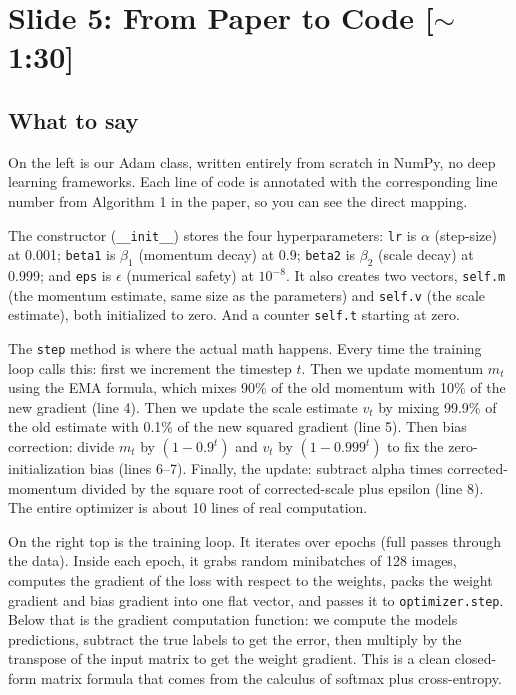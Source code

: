 \documentclass[11pt, letterpaper]{article}
\begin{document}
\section{Slide 5: From Paper to Code \textnormal{\color{muted}[$\sim$1:30]}}

\subsection{What to say}

On the left is our Adam class, written entirely from scratch in NumPy, no deep learning frameworks. Each line of code is annotated with the corresponding line number from Algorithm 1 in the paper, so you can see the direct mapping.

The constructor (\texttt{\_\_init\_\_}) stores the four hyperparameters: \texttt{lr} is $\alpha$ (step-size) at 0.001; \texttt{beta1} is $\beta_1$ (momentum decay) at 0.9; \texttt{beta2} is $\beta_2$ (scale decay) at 0.999; and \texttt{eps} is $\epsilon$ (numerical safety) at $10^{-8}$. It also creates two vectors, \texttt{self.m} (the momentum estimate, same size as the parameters) and \texttt{self.v} (the scale estimate), both initialized to zero. And a counter \texttt{self.t} starting at zero.

The \texttt{step} method is where the actual math happens. Every time the training loop calls this: first we increment the timestep $t$. Then we update momentum $m_t$ using the EMA formula, which mixes 90\% of the old momentum with 10\% of the new gradient (line 4). Then we update the scale estimate $v_t$ by mixing 99.9\% of the old estimate with 0.1\% of the new squared gradient (line 5). Then bias correction: divide $m_t$ by $(1 - 0.9^t)$ and $v_t$ by $(1 - 0.999^t)$ to fix the zero-initialization bias (lines 6--7). Finally, the update: subtract alpha times corrected-momentum divided by the square root of corrected-scale plus epsilon (line 8). The entire optimizer is about 10 lines of real computation.

On the right top is the training loop. It iterates over epochs (full passes through the data). Inside each epoch, it grabs random minibatches of 128 images, computes the gradient of the loss with respect to the weights, packs the weight gradient and bias gradient into one flat vector, and passes it to \texttt{optimizer.step}. Below that is the gradient computation function: we compute the models predictions, subtract the true labels to get the error, then multiply by the transpose of the input matrix to get the weight gradient. This is a clean closed-form matrix formula that comes from the calculus of softmax plus cross-entropy.
\end{document}
